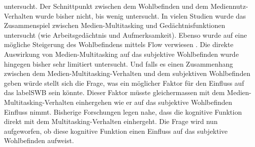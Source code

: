 untersucht. Der Schnittpunkt zwischen dem Wohlbefinden und dem Mediennutz-Verhalten wurde bisher nicht, bis wenig untersucht. 
In vielen Studien wurde das Zusammenspiel zwischen Medien-Multitasking und Gedächtnisfunktionen untersucht (wie Arbeitsgedächtnis und Aufmerksamkeit). Ebenso wurde auf eine mögliche Steigerung des Wohlbefindens mittels Flow verwiesen \cite{Klingberg2008}. Die direkte Auswirkung von Medien-Multitasking auf das subjektive Wohlbefinden wurde hingegen bisher sehr limitiert untersucht. Und falls es einen Zusammenhang zwischen dem Medien-Multitasking-Verhalten und dem subjektiven Wohlbefinden geben würde stellt sich die Frage, was ein möglicher Faktor für den Einfluss auf das \gls{labelSWB} sein könnte. Dieser Faktor müsste gleichermassen mit dem Medien-Multitasking-Verhalten einhergehen wie er auf das subjektive Wohlbefinden Einfluss nimmt. Bisherige Forschungen legen nahe, dass die kognitive Funktion direkt mit dem Multitasking-Verhalten einhergeht. Die Frage wird nun aufgeworfen, ob diese kognitive Funktion einen Einfluss auf das subjektive Wohlbefinden aufweist. 

